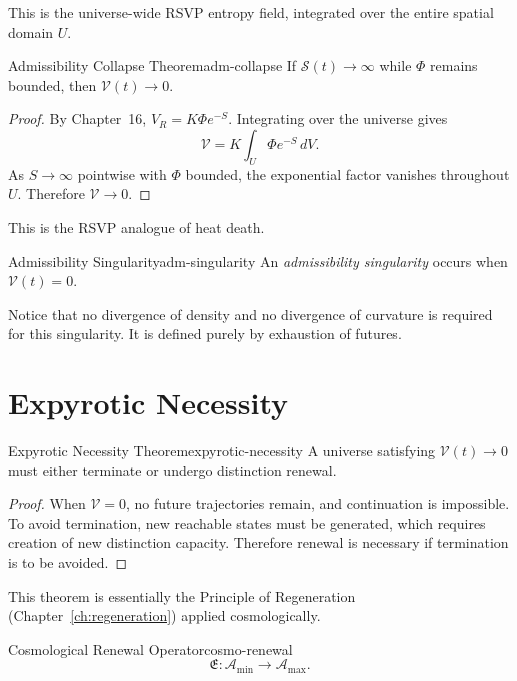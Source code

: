 \documentclass[12pt,twoside,openright]{book}
\begin{document}
This is the universe-wide RSVP entropy field, integrated
over the entire spatial domain $U$.

\begin{theorem}{Admissibility Collapse Theorem}{adm-collapse}
  If $\mathcal{S}(t) \to \infty$ while $\Phi$ remains
  bounded, then $\mathcal{V}(t) \to 0$.
\end{theorem}

\begin{proof}
  By Chapter~16, $V_R = K\Phi e^{-S}$. Integrating over the
  universe gives
  \[
    \mathcal{V} = K \int_U \Phi e^{-S} \, dV.
  \]
  As $S \to \infty$ pointwise with $\Phi$ bounded, the
  exponential factor vanishes throughout $U$. Therefore
  $\mathcal{V} \to 0$.
\end{proof}

This is the RSVP analogue of heat death.

\begin{definition}{Admissibility Singularity}{adm-singularity}
  An \emph{admissibility singularity} occurs when
  $\mathcal{V}(t) = 0$.
\end{definition}

Notice that no divergence of density and no divergence of
curvature is required for this singularity. It is defined
purely by exhaustion of futures.

\section{Expyrotic Necessity}
\label{sec:ch18-necessity}

\begin{theorem}{Expyrotic Necessity Theorem}{expyrotic-necessity}
  A universe satisfying $\mathcal{V}(t) \to 0$ must either
  terminate or undergo distinction renewal.
\end{theorem}

\begin{proof}
  When $\mathcal{V} = 0$, no future trajectories remain, and
  continuation is impossible. To avoid termination, new
  reachable states must be generated, which requires
  creation of new distinction capacity. Therefore renewal
  is necessary if termination is to be avoided.
\end{proof}

This theorem is essentially the Principle of Regeneration
(Chapter~\ref{ch:regeneration}) applied
cosmologically.

\begin{definition}{Cosmological Renewal Operator}{cosmo-renewal}
  \[
    \mathfrak{E} : \mathcal{A}_{\min} \to \mathcal{A}_{\max}.
  \]
\end{definition}
\end{document}
